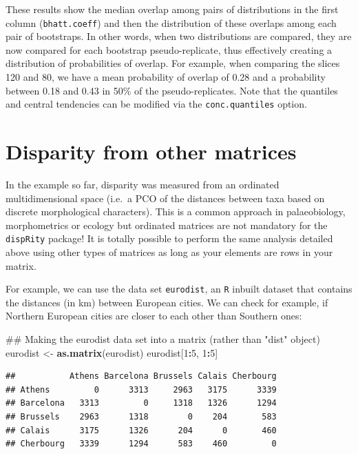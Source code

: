 \documentclass[]{book}
\newenvironment{Shaded}{\begin{snugshade}}{\end{snugshade}}
\newcommand{\KeywordTok}[1]{\textcolor[rgb]{0.13,0.29,0.53}{\textbf{#1}}}
\newcommand{\DecValTok}[1]{\textcolor[rgb]{0.00,0.00,0.81}{#1}}
\newcommand{\StringTok}[1]{\textcolor[rgb]{0.31,0.60,0.02}{#1}}
\newcommand{\OperatorTok}[1]{\textcolor[rgb]{0.81,0.36,0.00}{\textbf{#1}}}
\newcommand{\NormalTok}[1]{#1}
\theoremstyle{definition}
\theoremstyle{definition}
\theoremstyle{remark}
\begin{document}
These results show the median overlap among pairs of distributions in
the first column (\texttt{bhatt.coeff}) and then the distribution of
these overlaps among each pair of bootstraps. In other words, when two
distributions are compared, they are now compared for each bootstrap
pseudo-replicate, thus effectively creating a distribution of
probabilities of overlap. For example, when comparing the slices 120 and
80, we have a mean probability of overlap of 0.28 and a probability
between 0.18 and 0.43 in 50\% of the pseudo-replicates. Note that the
quantiles and central tendencies can be modified via the
\texttt{conc.quantiles} option.

\section{Disparity from other
matrices}\label{disparity-from-other-matrices}

In the example so far, disparity was measured from an ordinated
multidimensional space (i.e.~a PCO of the distances between taxa based
on discrete morphological characters). This is a common approach in
palaeobiology, morphometrics or ecology but ordinated matrices are not
mandatory for the \texttt{dispRity} package! It is totally possible to
perform the same analysis detailed above using other types of matrices
as long as your elements are rows in your matrix.

For example, we can use the data set \texttt{eurodist}, an \texttt{R}
inbuilt dataset that contains the distances (in km) between European
cities. We can check for example, if Northern European cities are closer
to each other than Southern ones:

\begin{Shaded}
\begin{Highlighting}[]
\NormalTok{## Making the eurodist data set into a matrix (rather than "dist" object)}
\NormalTok{eurodist <-}\StringTok{ }\KeywordTok{as.matrix}\NormalTok{(eurodist)}
\NormalTok{eurodist[}\DecValTok{1}\OperatorTok{:}\DecValTok{5}\NormalTok{, }\DecValTok{1}\OperatorTok{:}\DecValTok{5}\NormalTok{]}
\end{Highlighting}
\end{Shaded}

\begin{verbatim}
##           Athens Barcelona Brussels Calais Cherbourg
## Athens         0      3313     2963   3175      3339
## Barcelona   3313         0     1318   1326      1294
## Brussels    2963      1318        0    204       583
## Calais      3175      1326      204      0       460
## Cherbourg   3339      1294      583    460         0
\end{verbatim}
\end{document}
